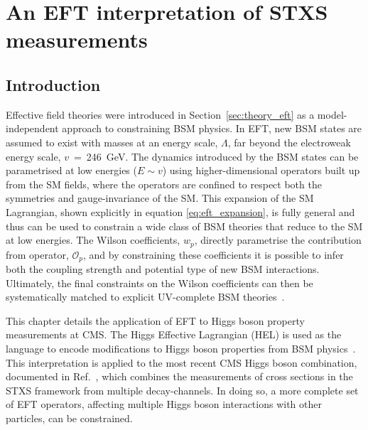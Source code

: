 \chapter{An EFT interpretation of STXS measurements}
\label{chap:eft}

\section{Introduction}
Effective field theories were introduced in Section~\ref{sec:theory_eft} as a model-independent approach to constraining BSM physics. In EFT, new BSM states are assumed to exist with masses at an energy scale, $\Lambda$, far beyond the electroweak energy scale, $v$~=~246~GeV. The dynamics introduced by the BSM states can be parametrised at low energies ($E \sim v$) using higher-dimensional operators built up from the SM fields, where the operators are confined to respect both the symmetries and gauge-invariance of the SM. This expansion of the SM Lagrangian, shown explicitly in equation \ref{eq:eft_expansion}, is fully general and thus can be used to constrain a wide class of BSM theories that reduce to the SM at low energies. The Wilson coefficients, $w_p$, directly parametrise the contribution from operator, $\mathcal{O}_p$, and by constraining these coefficients it is possible to infer both the coupling strength and potential type of new BSM interactions. Ultimately, the final constraints on the Wilson coefficients can then be systematically matched to explicit UV-complete BSM theories~\cite{Marzocca:2020jze}.

This chapter details the application of EFT to Higgs boson property measurements at CMS. The Higgs Effective Lagrangian (HEL) is used as the language to encode modifications to Higgs boson properties from BSM physics~\cite{Contino:2013kra,Alloul:2013naa}. This interpretation is applied to the most recent CMS Higgs boson combination, documented in Ref.~\cite{CMS-PAS-HIG-19-005}, which combines the measurements of cross sections in the STXS framework from multiple decay-channels. In doing so, a more complete set of EFT operators, affecting multiple Higgs boson interactions with other particles, can be constrained. 

